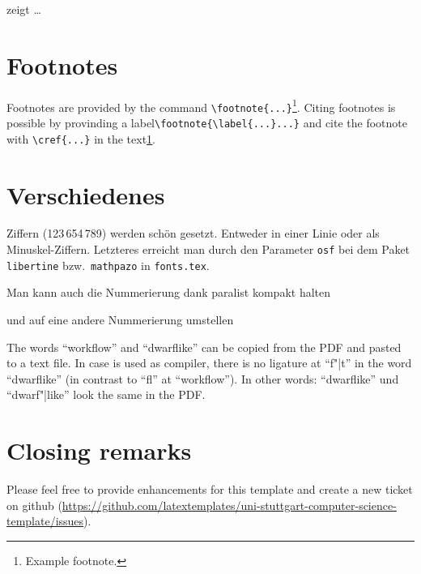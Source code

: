  zeigt \ldots

\section{Footnotes}
Footnotes are provided by the command \verb+\footnote{...}+\footnote{\label{fussnote}Example footnote.}. Citing footnotes is possible by provinding a label\verb+\footnote{\label{...}...}+ and cite the footnote with \verb+\cref{...}+ in the text\cref{fussnote}.

\section{Verschiedenes}
\label{sec:diff}
\ifdeutsch
  Ziffern (123\,654\,789) werden schön gesetzt.
  Entweder in einer Linie oder als Minuskel-Ziffern.
  Letzteres erreicht man durch den Parameter \texttt{osf} bei dem Paket \texttt{libertine} bzw.\ \texttt{mathpazo} in \texttt{fonts.tex}.
\fi

\begin{compactenum}[I.]
  \item Man kann auch die Nummerierung dank paralist kompakt halten
  \item und auf eine andere Nummerierung umstellen
\end{compactenum}

The words \enquote{workflow} and \enquote{dwarflike} can be copied from the PDF and pasted to a text file.
In case \LuaLaTeX{} is used as compiler, there is no ligature at \enquote{f"|t} in the word \enquote{dwarflike} (in contrast to \enquote{fl} at \enquote{workflow}).
In other words: \enquote{dwarflike} und \enquote{dwarf"|like} look the same in the PDF.


\section{Closing remarks}
Please feel free to provide enhancements for this template and create a new ticket on github (\url{https://github.com/latextemplates/uni-stuttgart-computer-science-template/issues}).
